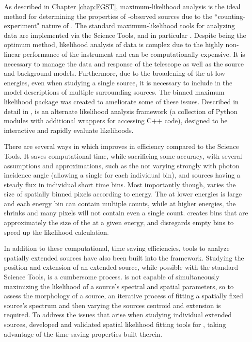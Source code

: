 As described in Chapter \ref{chap:FGST}, maximum-likelihood analysis is the ideal method for determining the properties of \lat{}-observed sources due to the ``counting-experiment" nature of \FermiLat{}. The standard maximum-likelihood tools for analyzing \lat{} data are implemented via the \Fermi{} Science Tools, and in particular \gtlike{}.  Despite being the optimum method, likelihood analysis of \lat{} data is complex due to the highly non-linear performance of the instrument and can be computationally expensive. It is necessary to manage the data and response of the telescope as well as the source and background models. Furthermore, due to the broadening of the \psf{} at low energies, even when studying a single source, it is necessary to include in the model descriptions of multiple surrounding sources. The \ptlike{} binned maximum likelihood package was created to ameliorate some of these issues. Described in detail in \cite{Kerr10}, \ptlike{} is an alternate likelihood analysis framework (a collection of Python modules with additional wrappers for accessing C++ code), designed to be interactive and rapidly evaluate likelihoods.  

There are several ways in which \ptlike{} improves in efficiency compared to the Science Tools. It saves computational time, while sacrificing some accuracy,
with several assumptions and approximations, such as the \psf{} not varying strongly with photon incidence angle (allowing a single \psf{} for each individual bin), and sources having a steady flux in individual short time bins. Most importantly though, \ptlike{} varies the size of spatially binned \heal{} pixels \citep{Gorski05} according to energy. The \psf{} at lower energies is large and each energy bin can contain multiple counts, while at higher energies, the \psf{} shrinks and many pixels will not contain even a single count. \ptlike{} creates \heal{} bins that are approximately the size of the \psf{} at a given energy, and disregards empty bins to speed up the likelihood calculation.

In addition to these computational, time saving efficiencies, tools to analyze spatially extended sources have also been built into the \ptlike{} framework. Studying the position and extension of an extended source, while possible with the standard \Fermi{} Science Tools, is a cumbersome process. \gtlike{} is not capable of simultaneously maximizing the likelihood of a source's spectral and spatial parameters, so to assess the morphology of a source, an iterative process of fitting a spatially fixed source's spectrum and then varying the sources centroid and extension is required. To address the issues that arise when studying individual extended sources, \cite{Lande12} developed and validated spatial likelihood fitting tools for \ptlike{}, taking advantage of the time-saving properties built therein.

